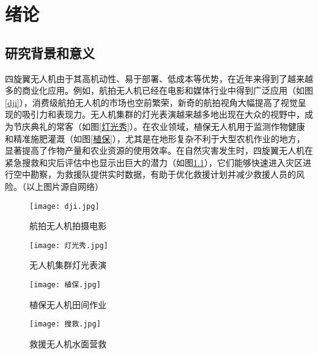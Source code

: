 
\chapter{绪论}
\section{研究背景和意义}

四旋翼无人机由于其高机动性、易于部署、低成本等优势，在近年来得到了越来越多的商业化应用。例如，航拍无人机已经在电影和媒体行业中得到广泛应用（如图\ref{dji}），消费级航拍无人机的市场也空前繁荣，新奇的航拍视角大幅提高了视觉呈现的吸引力和表现力。无人机集群的灯光表演越来越多地出现在大众的视野中，成为节庆典礼的常客（如图\ref{灯光秀}）。在农业领域，植保无人机用于监测作物健康和精准施肥灌溉\cite{tokekar2016agricluture}（如图\ref{植保}），尤其是在地形复杂不利于大型农机作业的地方，显著提高了作物产量和农业资源的使用效率。在自然灾害发生时，四旋翼无人机在紧急搜救和灾后评估中也显示出巨大的潜力\cite{tomic2012}（如图\ref{救援}），它们能够快速进入灾区进行空中勘察，为救援队提供实时数据，有助于优化救援计划并减少救援人员的风险。（以上图片源自网络）

\begin{figure}[htb]
    \centering
    \begin{minipage}[b]{0.49\linewidth}
        \texttt{[image: dji.jpg]}
        \caption{航拍无人机拍摄电影}
        \label{dji}
    \end{minipage}
    \hfill %
    \begin{minipage}[b]{0.49\linewidth}
        \texttt{[image: 灯光秀.jpg]}
        \caption{无人机集群灯光表演}
        \label{灯光秀}
    \end{minipage}


    \begin{minipage}[b]{0.49\linewidth}
        \texttt{[image: 植保.jpg]}
        \caption{植保无人机田间作业}
        \label{植保}
    \end{minipage}
    \hfill
    \begin{minipage}[b]{0.49\linewidth}
        \texttt{[image: 搜救.jpg]}
        \caption{救援无人机水面营救}
        \label{救援}
    \end{minipage}
\end{figure}

